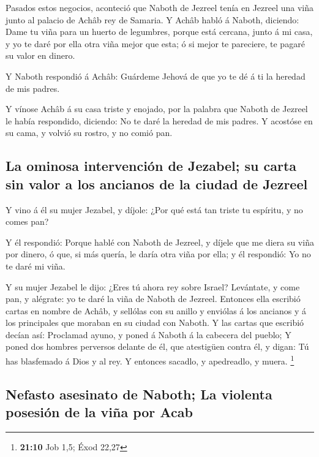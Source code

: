  Pasados estos negocios, aconteció que Naboth de Jezreel
tenía en Jezreel una viña junto al palacio de Achâb rey de Samaria.
 Y Achâb habló á Naboth, diciendo: Dame tu viña para un
huerto de legumbres, porque está cercana, junto á mi casa, y yo te daré
por ella otra viña mejor que esta; ó si mejor te pareciere, te pagaré su
valor en dinero.

 Y Naboth respondió á Achâb: Guárdeme Jehová de que yo te dé
á ti la heredad de mis padres.

 Y vínose Achâb á su casa triste y enojado, por la palabra
que Naboth de Jezreel le había respondido, diciendo: No te daré la
heredad de mis padres. Y acostóse en su cama, y volvió su rostro, y no
comió pan.

\hypertarget{la-ominosa-intervenciuxf3n-de-jezabel-su-carta-sin-valor-a-los-ancianos-de-la-ciudad-de-jezreel}{%
\subsection{La ominosa intervención de Jezabel; su carta sin valor a los
ancianos de la ciudad de
Jezreel}\label{la-ominosa-intervenciuxf3n-de-jezabel-su-carta-sin-valor-a-los-ancianos-de-la-ciudad-de-jezreel}}

 Y vino á él su mujer Jezabel, y díjole: ¿Por qué está tan
triste tu espíritu, y no comes pan?

 Y él respondió: Porque hablé con Naboth de Jezreel, y
díjele que me diera su viña por dinero, ó que, si más quería, le daría
otra viña por ella; y él respondió: Yo no te daré mi viña.

 Y su mujer Jezabel le dijo: ¿Eres tú ahora rey sobre
Israel? Levántate, y come pan, y alégrate: yo te daré la viña de Naboth
de Jezreel.  Entonces ella escribió cartas en nombre de
Achâb, y sellólas con su anillo y enviólas á los ancianos y á los
principales que moraban en su ciudad con Naboth.  Y las
cartas que escribió decían así: Proclamad ayuno, y poned á Naboth á la
cabecera del pueblo;  Y poned dos hombres perversos delante
de él, que atestigüen contra él, y digan: Tú has blasfemado á Dios y al
rey. Y entonces sacadlo, y apedreadlo, y muera. \footnote{\textbf{21:10}
  Job 1,5; Éxod 22,27}

\hypertarget{nefasto-asesinato-de-naboth-la-violenta-posesiuxf3n-de-la-viuxf1a-por-acab}{%
\subsection{Nefasto asesinato de Naboth; La violenta posesión de la viña
por
Acab}\label{nefasto-asesinato-de-naboth-la-violenta-posesiuxf3n-de-la-viuxf1a-por-acab}}


